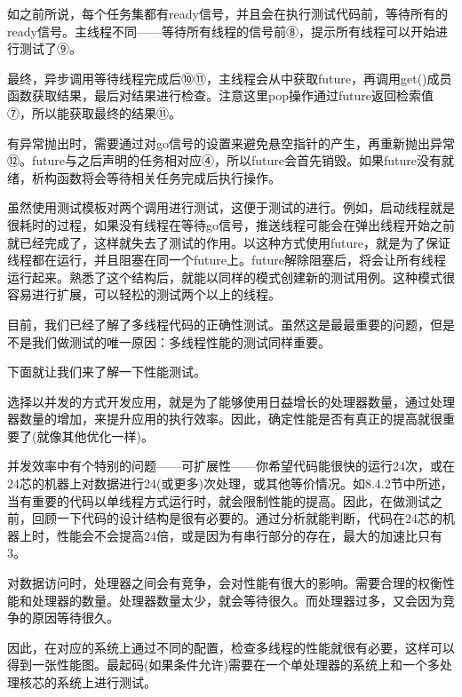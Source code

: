如之前所说，每个任务集都有ready信号，并且会在执行测试代码前，等待所有的ready信号。主线程不同——等待所有线程的信号前⑧，提示所有线程可以开始进行测试了⑨。

最终，异步调用等待线程完成后⑩⑪，主线程会从中获取future，再调用get()成员函数获取结果，最后对结果进行检查。注意这里pop操作通过future返回检索值⑦，所以能获取最终的结果⑪。

有异常抛出时，需要通过对go信号的设置来避免悬空指针的产生，再重新抛出异常⑫。future与之后声明的任务相对应④，所以future会首先销毁。如果future没有就绪，析构函数将会等待相关任务完成后执行操作。

虽然使用测试模板对两个调用进行测试，这便于测试的进行。例如，启动线程就是很耗时的过程，如果没有线程在等待go信号，推送线程可能会在弹出线程开始之前就已经完成了，这样就失去了测试的作用。以这种方式使用future，就是为了保证线程都在运行，并且阻塞在同一个future上。future解除阻塞后，将会让所有线程运行起来。熟悉了这个结构后，就能以同样的模式创建新的测试用例。这种模式很容易进行扩展，可以轻松的测试两个以上的线程。

目前，我们已经了解了多线程代码的正确性测试。虽然这是最最重要的问题，但是不是我们做测试的唯一原因：多线程性能的测试同样重要。

下面就让我们来了解一下性能测试。


选择以并发的方式开发应用，就是为了能够使用日益增长的处理器数量，通过处理器数量的增加，来提升应用的执行效率。因此，确定性能是否有真正的提高就很重要了(就像其他优化一样)。

并发效率中有个特别的问题——可扩展性——你希望代码能很快的运行24次，或在24芯的机器上对数据进行24(或更多)次处理，或其他等价情况。如8.4.2节中所述，当有重要的代码以单线程方式运行时，就会限制性能的提高。因此，在做测试之前，回顾一下代码的设计结构是很有必要的。通过分析就能判断，代码在24芯的机器上时，性能会不会提高24倍，或是因为有串行部分的存在，最大的加速比只有3。

对数据访问时，处理器之间会有竞争，会对性能有很大的影响。需要合理的权衡性能和处理器的数量。处理器数量太少，就会等待很久。而处理器过多，又会因为竞争的原因等待很久。

因此，在对应的系统上通过不同的配置，检查多线程的性能就很有必要，这样可以得到一张性能图。最起码(如果条件允许)需要在一个单处理器的系统上和一个多处理核芯的系统上进行测试。